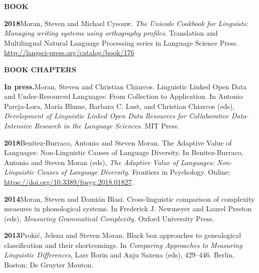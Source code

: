 \documentclass[11pt]{article}
\newcommand{\hangpara}{
 \setlength{\parindent}{0in} %
 \hangindent=0.42in %
}
\begin{document}
\vskip 20pt
\begin{flushleft}
{\bf BOOK}
\end{flushleft}

\hangpara
{\bf 2018}\hspace{1ex}Moran, Steven and Michael Cysouw. {\it The Unicode Cookbook for Linguists: Managing writing systems using orthography profiles}. Translation and Multilingual Natural Language Processing series in Language Science Press. \url{http://langsci-press.org/catalog/book/176}


\vskip 20pt
\begin{flushleft}
{\bf BOOK CHAPTERS}
\end{flushleft}

\begin{comment}
\hangpara{\bf Invited.}\hspace{1ex}Moran, Steven. Managing data in the development of PHOIBLE: the Phonetics Information Base and Lexicon (PHOIBLE) database. In Andrea L. Berez-Kroeker, Bradley McDonnell, & Eve Koller (eds), \textit{The Open Handbook of Linguistic Data Management: Open Handbooks in Linguistics}. MIT Press.
\end{comment}

\hangpara{\bf In press.}\hspace{1ex}Moran, Steven and Christian Chiarcos. Linguistic Linked Open Data and Under-Resourced Languages: From Collection to Application. In Antonio Pareja-Lora, María Blume, Barbara C. Lust, and Christian Chiarcos (eds), \textit{Development of Linguistic Linked Open Data Resources for Collaborative Data-Intensive Research in the Language Sciences}. MIT Press.

\vskip 6pt
\hangpara{\bf 2018}\hspace{1ex}Benitez-Burraco, Antonio and Steven Moran. The Adaptive Value of Languages: Non-Linguistic Causes of Language Diversity. In Benitez-Burraco, Antonio and Steven Moran (eds), \textit{The Adaptive Value of Languages: Non-Linguistic Causes of Language Diversity}. Frontiers in Psychology. Online: \url{https://doi.org/10.3389/fpsyg.2018.01827}.

\vskip 6pt
\hangpara{\bf 2014}\hspace{1ex}Moran, Steven and Dami{\'a}n Blasi. Cross-linguistic comparison of complexity measures in phonological systems. In Frederick J. Newmeyer and Laurel Preston (eds), {\it Measuring Grammatical Complexity}. Oxford University Press. 

\vskip 6pt
\hangpara
{\bf 2013}\hspace{1ex}Proki{\'c}, Jelena and Steven Moran. Black box approaches to genealogical classification and their shortcomings. In {\it Comparing Approaches to Measuring Linguistic Differences}, Lars Borin and Anju Saxena (eds), 429--446. Berlin, Boston: De Gruyter Mouton.
\end{document}

